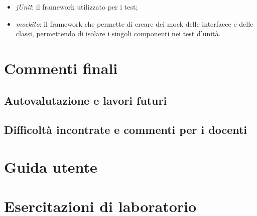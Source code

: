 \begin{itemize}
    \item \emph{jUnit}: il framework utilizzato per i test;
    
    \item \emph{mockito}: il framework che permette di creare dei mock delle interfacce e delle classi, permettendo di isolare i singoli componenti nei test d'unità.
\end{itemize}

\chapter{Commenti finali}

\section{Autovalutazione e lavori futuri}


\section{Difficoltà incontrate e commenti per i docenti}

\appendix
\chapter{Guida utente}

\chapter{Esercitazioni di laboratorio}






